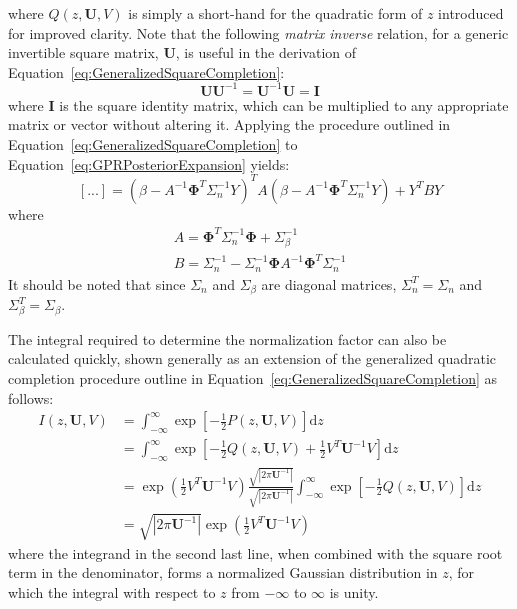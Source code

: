 \documentclass{article}
\begin{document}
where $Q\!\left(z,\mathbf{U},V\right)$ is simply a short-hand for the quadratic form of $z$ introduced for improved clarity. Note that the following \emph{matrix inverse} relation, for a generic invertible square matrix, $\mathbf{U}$, is useful in the derivation of Equation~\eqref{eq:GeneralizedSquareCompletion}:
\begin{equation}
\label{eq:MatrixInverseRelation}
	\mathbf{U} \mathbf{U}^{-1} = \mathbf{U}^{-1} \mathbf{U} = \mathbf{I}
\end{equation}
where $\mathbf{I}$ is the square identity matrix, which can be multiplied to any appropriate matrix or vector without altering it. Applying the procedure outlined in Equation~\eqref{eq:GeneralizedSquareCompletion} to Equation~\eqref{eq:GPRPosteriorExpansion} yields:
\begin{equation}
\label{eq:GPRPosteriorSquareCompletion}
	\left[...\right] = \left(\beta - A^{-1} \mathbf{\Phi}^T \Sigma_n^{-1} Y\right)^T \! A \left(\beta - A^{-1} \mathbf{\Phi}^T \Sigma_n^{-1} Y\right) + Y^T B Y
\end{equation}
where
\begin{equation}
\label{eq:ABVariableReplacement}
	\begin{gathered}
	A = \mathbf{\Phi}^T \Sigma_n^{-1} \mathbf{\Phi} + \Sigma_\beta^{-1}\\
	B = \Sigma_n^{-1} - \Sigma_n^{-1} \mathbf{\Phi} A^{-1} \mathbf{\Phi}^T \Sigma_n^{-1}
	\end{gathered}
\end{equation}
It should be noted that since $\Sigma_n$ and $\Sigma_\beta$ are diagonal matrices, $\Sigma_n^T = \Sigma_n$ and $\Sigma_\beta^T = \Sigma_\beta$.

The integral required to determine the normalization factor can also be calculated quickly, shown generally as an extension of the generalized quadratic completion procedure outline in Equation~\eqref{eq:GeneralizedSquareCompletion} as follows:
\begin{equation}
\label{eq:GeneralizedGaussianIntegralProcedure}
	\begin{aligned}
	I\!\left(z,\mathbf{U},V\right) &= \int_{-\infty}^{\infty} \exp\!\left[-\frac{1}{2} P\!\left(z,\mathbf{U},V\right)\right] \text{d}z \\
	&= \int_{-\infty}^{\infty} \exp\!\left[-\frac{1}{2} Q\!\left(z,\mathbf{U},V\right) + \frac{1}{2} V^T \mathbf{U}^{-1} V\right] \text{d}z \\
	&= \exp\!\left(\frac{1}{2} V^T \mathbf{U}^{-1} V\right) \frac{\sqrt{\left|2 \pi \mathbf{U}^{-1}\right|}}{\sqrt{\left|2 \pi \mathbf{U}^{-1}\right|}} \int_{-\infty}^{\infty} \exp\!\left[-\frac{1}{2} Q\!\left(z,\mathbf{U},V\right)\right] \text{d}z \\
	&= \sqrt{\left|2 \pi \mathbf{U}^{-1}\right|} \exp\!\left(\frac{1}{2} V^T \mathbf{U}^{-1} V\right)
	\end{aligned}
\end{equation}
where the integrand in the second last line, when combined with the square root term in the denominator, forms a normalized Gaussian distribution in $z$, for which the integral with respect to $z$ from $-\infty$ to $\infty$ is unity.
\end{document}
